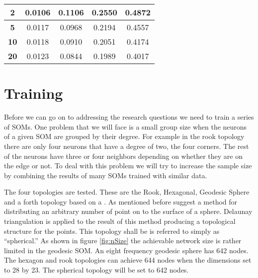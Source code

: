 \begin{table}
{\begin{tabular}{|c||c|c|c|c|}
  \hline
  \textbf{2} & 0.0106& 0.1106& 0.2550& 0.4872 \\
  \hline
  \textbf{5} & 0.0117& 0.0968& 0.2194& 0.4557 \\
  \hline
  \textbf{10} & 0.0118& 0.0910& 0.2051& 0.4174 \\
  \hline
  \textbf{20} & 0.0123& 0.0844& 0.1989& 0.4017 \\
  \hline
  \end{tabular} 
  \label{ivtable1:graph}
} 
\end{table}

\section{Training}
Before we can go on to addressing the research questions we need to train a
series of SOMs. One problem that we will face is a small group size when the
neurons of a given SOM are grouped by their degree.  For example in the rook
topology there are only four neurons that have a degree of two, the four
corners. The rest of the neurons have three or four neighbors depending on
whether they are on the edge or not. To deal with this problem we will try to
increase the sample size by combining the results of many SOMs trained with
similar data.

The four topologies are tested. These are the Rook, Hexagonal, Geodesic Sphere
and a forth topology based on a \cite{Rakhmanov94}. As mentioned before
\cite{Rakhmanov94} suggest a method for distributing an arbitrary number of
point on to the surface of a sphere.  Delaunay triangulation is applied to the
result of this method producing a topological structure for the points.  This
topology shall be is referred to simply as ``spherical.''  As shown in figure
\ref{fig:nSize} the achievable network size is rather limited in the geodesic
SOM.  An eight frequency geodesic sphere has 642 nodes. The hexagon and rook
topologies can achieve 644 nodes when the dimensions set to 28 by 23. The
spherical topology will be set to 642 nodes.

